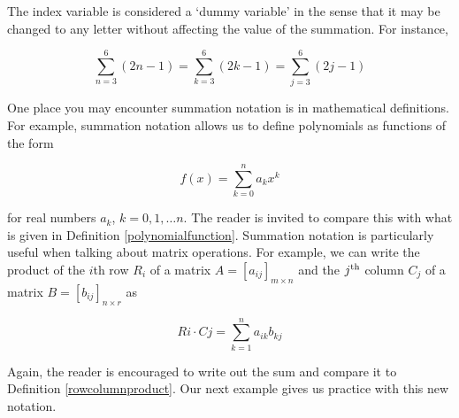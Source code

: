 The index variable  is considered a `dummy variable' in the sense that it may be changed to any letter without affecting the value of the summation.  For instance, 

\[ \displaystyle{\sum_{n=3}^{6}(2n-1)} = \displaystyle{\sum_{k=3}^{6}(2k-1)} = \displaystyle{\sum_{j=3}^{6}(2j-1)}\]

One place you may encounter summation notation is in mathematical definitions.  For example, summation notation allows us to define polynomials as functions of the form

\[ f(x) = \displaystyle{\sum_{k=0}^{n} a_{k} x^{k}} \]

for real numbers $a_{k}$, $k = 0, 1, \ldots n$.  The reader is invited to compare this with what is given in Definition \ref{polynomialfunction}.  Summation notation is particularly useful when talking about matrix operations.  For example, we can write the product of the $i$th row $R_{i}$ of a matrix $A = [a_{ij}]_{m \times n}$ and the $j^{\mbox{\scriptsize th}}$ column $C_{j}$ of a matrix $B = [b_{ij}]_{n \times r}$ as

\[ Ri \cdot Cj = \displaystyle{\sum_{k=1}^{n} a_{ik}b_{kj}} \]

Again, the reader is encouraged to write out the sum and compare it to Definition \ref{rowcolumnproduct}.  Our next example gives us practice with this new notation. 

